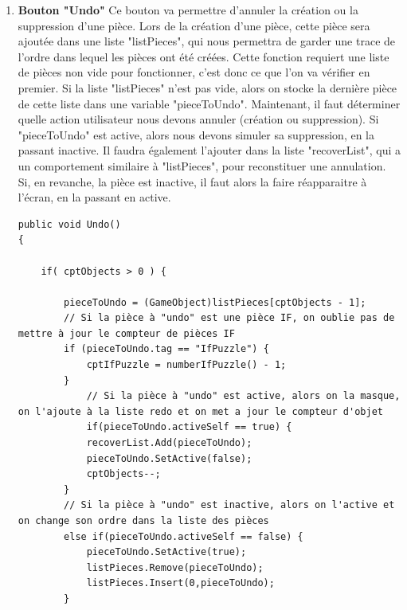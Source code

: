 \documentclass{report}
\begin{document}
\begin{enumerate}[label=\Alph*)]
\item\textbf{Bouton "Undo"} \newline
Ce bouton va permettre d'annuler la création ou la suppression d'une pièce. Lors de la création d'une pièce, cette pièce sera ajoutée dans une liste "listPieces", qui nous permettra de garder une trace de l'ordre dans lequel les pièces ont été créées.
\smallbreak
Cette fonction requiert une liste de pièces non vide pour fonctionner, c'est donc ce que l'on va vérifier en premier. Si la liste "listPieces" n'est pas vide, alors on stocke la dernière pièce de cette liste dans une variable "pieceToUndo".\newline
Maintenant, il faut déterminer quelle action utilisateur nous devons annuler (création ou suppression).\newline
Si "pieceToUndo" est active, alors nous devons simuler sa suppression, en la passant inactive. Il faudra également l'ajouter dans la liste "recoverList", qui a un comportement similaire à "listPieces", pour reconstituer une annulation.\newline
Si, en revanche, la pièce est inactive, il faut alors la faire réapparaitre à l'écran, en la passant en active.

\begin{lstlisting}[language={[Sharp]C},label={lst:Undo()()}, caption= Extrait du code de createPuzzle.cs]
public void Undo()
{

    if( cptObjects > 0 ) {
		
        pieceToUndo = (GameObject)listPieces[cptObjects - 1];
        // Si la pièce à "undo" est une pièce IF, on oublie pas de mettre à jour le compteur de pièces IF
        if (pieceToUndo.tag == "IfPuzzle") {
            cptIfPuzzle = numberIfPuzzle() - 1;
        }
            // Si la pièce à "undo" est active, alors on la masque, on l'ajoute à la liste redo et on met a jour le compteur d'objet
            if(pieceToUndo.activeSelf == true) {
            recoverList.Add(pieceToUndo);
            pieceToUndo.SetActive(false);
            cptObjects--;
        }
        // Si la pièce à "undo" est inactive, alors on l'active et on change son ordre dans la liste des pièces
        else if(pieceToUndo.activeSelf == false) {
            pieceToUndo.SetActive(true);
            listPieces.Remove(pieceToUndo);
            listPieces.Insert(0,pieceToUndo);
        }


\end{lstlisting}
\end{enumerate}
\end{document}
